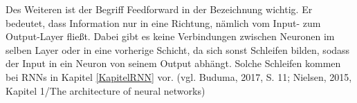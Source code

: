 \documentclass[a4paper,12pt,ngerman,oneside]{scrreprt}	%
\begin{document}
		Des Weiteren ist der Begriff Feedforward in der Bezeichnung wichtig. Er bedeutet, dass Information nur in eine Richtung, nämlich vom Input- zum Output-Layer fließt. Dabei gibt es keine Verbindungen zwischen Neuronen im selben Layer oder in eine vorherige Schicht, da sich sonst Schleifen bilden, sodass der Input in ein Neuron von seinem Output abhängt. Solche Schleifen kommen bei RNNs in Kapitel \ref{KapitelRNN} vor. (vgl. Buduma, 2017, S. 11; Nielsen, 2015, Kapitel 1/The architecture of neural networks)
		
		
\end{document}
